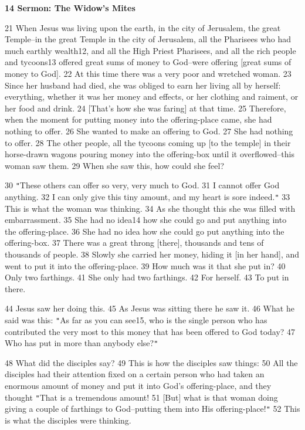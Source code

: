 
\textbf{14 Sermon: The Widow's Mites}

21 When Jesus was living upon the earth, in the city of Jerusalem, the great Temple--in
the great Temple in the city of Jerusalem, all the Pharisees who had much earthly
wealth12, and all the High Priest Pharisees, and all the rich people and tycoons13
offered great sums of money to God--were offering [great sums of money to God].
22 At this time there was a very poor and wretched woman. 23 Since her husband
had died, she was obliged to earn her living all by herself: everything, whether
it was her money and effects, or her clothing and raiment, or her food and drink.
24 [That's how she was faring] at that time. 25 Therefore, when the moment for
putting money into the offering-place came, she had nothing to offer. 26 She wanted
to make an offering to God. 27 She had nothing to offer. 28 The other people, all
the tycoons coming up [to the temple] in their horse-drawn wagons pouring money
into the offering-box until it overflowed--this woman saw them. 29 When she saw
this, how could she feel?

30 \texttt{"}These others can offer so very, very much to God. 31 I cannot offer
God anything. 32 I can only give this tiny amount, and my heart is sore indeed.\texttt{"}
33 This is what the woman was thinking. 34 As she thought this she was filled with
embarrassment. 35 She had no idea14 how she could go and put anything into the
offering-place. 36 She had no idea how she could go put anything into the offering-box.
37 There was a great throng [there], thousands and tens of thousands of people.
38 Slowly she carried her money, hiding it [in her hand], and went to put it into
the offering-place. 39 How much was it that she put in? 40 Only two farthings.
41 She only had two farthings. 42 For herself. 43 To put in there.

44 Jesus saw her doing this. 45 As Jesus was sitting there he saw it. 46 What he
said was this: \texttt{"}As far as you can see15, who is the single person who
has contributed the very most to this money that has been offered to God today?
47 Who has put in more than anybody else?\texttt{"}

48 What did the disciples say? 49 This is how the disciples saw things: 50 All
the disciples had their attention fixed on a certain person who had taken an enormous
amount of money and put it into God's offering-place, and they thought \texttt{"}That
is a tremendous amount! 51 [But] what is that woman doing giving a couple of farthings
to God--putting them into His offering-place!\texttt{"} 52 This is what the disciples
were thinking.

